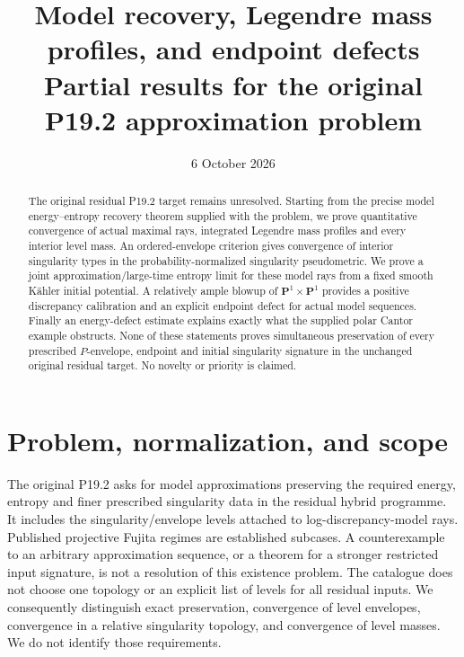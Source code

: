 \documentclass[11pt]{article}
\title{Model recovery, Legendre mass profiles, and endpoint defects\\
Partial results for the original P19.2 approximation problem}
\author{}\date{6 October 2026}
\theoremstyle{remark}\newtheorem{remark}[theorem]{Remark}
\begin{document}
\maketitle
\begin{abstract}
The original residual P19.2 target remains unresolved. Starting from
the precise model energy--entropy recovery theorem supplied with the
problem, we prove quantitative convergence of actual maximal rays,
integrated Legendre mass profiles and every interior level mass. An
ordered-envelope criterion gives convergence of interior singularity types
in the probability-normalized singularity pseudometric. We prove a
joint approximation/large-time entropy limit for these model rays
from a fixed smooth K\"ahler initial potential. A relatively ample
blowup of $\mathbf P^1\times\mathbf P^1$ provides a positive
discrepancy calibration and an explicit endpoint defect for actual
model sequences. Finally an energy-defect estimate explains exactly
what the supplied polar Cantor example obstructs. None of these
statements proves simultaneous preservation of every prescribed
$P$-envelope, endpoint and initial singularity signature in the
unchanged original residual target. No novelty or priority is claimed.
\end{abstract}

\section{Problem, normalization, and scope}
The original P19.2 asks for model approximations preserving the required
energy, entropy and finer prescribed singularity data in the residual
hybrid programme. It includes the singularity/envelope levels attached
to log-discrepancy-model rays. Published projective Fujita regimes are
established subcases. A counterexample to an arbitrary approximation
sequence, or a theorem for a stronger restricted input signature, is
not a resolution of this existence problem. The catalogue does not
choose one topology or an explicit list of levels for all residual
inputs. We consequently distinguish exact preservation, convergence
of level envelopes, convergence in a relative singularity topology,
and convergence of level masses. We do not identify those requirements.
\end{document}
